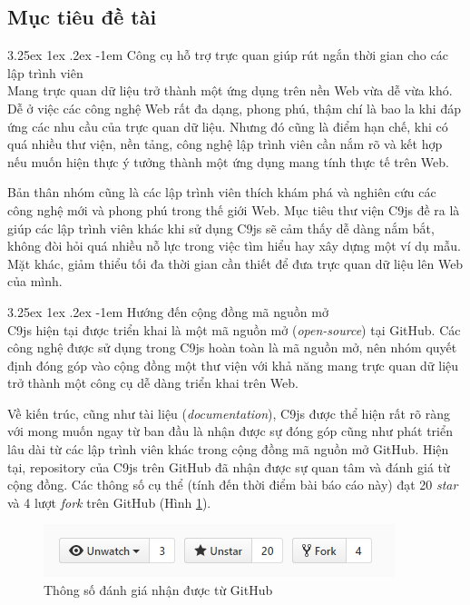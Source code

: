 \documentclass[12pt,a4paper,twoside]{article}
\makeatletter
\newcommand{\myparagraph}[1]{\paragraph{#1}\mbox{}\\} %
\renewcommand\paragraph{\@startsection{paragraph}{5}{\z@}%
  {3.25ex \@plus1ex \@minus.2ex}%
  {-1em}%
  {\normalfont\normalsize\bfseries}}
\makeatother
\begin{document}
\subsection{Mục tiêu đề tài}
\myparagraph{Công cụ hỗ trợ trực quan giúp rút ngắn thời gian cho các lập trình viên}
Mang trực quan dữ liệu trở thành một ứng dụng trên nền Web vừa dễ vừa khó. Dễ ở việc các công nghệ Web rất đa dạng, phong phú, thậm chí là bao la khi đáp ứng các nhu cầu của trực quan dữ liệu. Nhưng đó cũng là điểm hạn chế, khi có quá nhiều thư viện, nền tảng, công nghệ lập trình viên cần nắm rõ và kết hợp nếu muốn hiện thực ý tưởng thành một ứng dụng mang tính thực tế trên Web.

Bản thân nhóm cũng là các lập trình viên thích khám phá và nghiên cứu các công nghệ mới và phong phú trong thế giới Web. Mục tiêu thư viện C9js đề ra là giúp các lập trình viên khác khi sử dụng C9js sẽ cảm thấy dễ dàng nắm bắt, không đòi hỏi quá nhiều nỗ lực trong việc tìm hiểu hay xây dựng một ví dụ mẫu. Mặt khác, giảm thiểu tối đa thời gian cần thiết để đưa trực quan dữ liệu lên Web của mình.

\myparagraph{Hướng đến cộng đồng mã nguồn mở}
C9js hiện tại được triển khai là một mã nguồn mở (\textit{open-source}) tại GitHub\cite{c9js_github}. Các công nghệ được sử dụng trong C9js hoàn toàn là mã nguồn mở, nên nhóm quyết định đóng góp vào cộng đồng một thư viện với khả năng mang trực quan dữ liệu trở thành một công cụ dễ dàng triển khai trên Web. 

Về kiến trúc, cũng như tài liệu (\textit{documentation}), C9js được thể hiện rất rõ ràng với mong muốn ngay từ ban đầu là nhận được sự đóng góp cũng như phát triển lâu dài từ các lập trình viên khác trong cộng đồng mã nguồn mở GitHub. Hiện tại, repository\cite{c9js_repo} của C9js trên GitHub đã nhận được sự quan tâm và đánh giá từ cộng đồng. Các thông số cụ thể (tính đến thời điểm bài báo cáo này) đạt 20 \textit{star} và 4 lượt \textit{fork} trên GitHub (Hình \ref{fig:repo_status}).

\begin{figure}[htp]
	\begin{center}
    \includegraphics[scale=1]{image/repo_status}
    \caption{Thông số đánh giá nhận được từ GitHub}
    \label{fig:repo_status}
	\end{center}
\end{figure}
\end{document}

